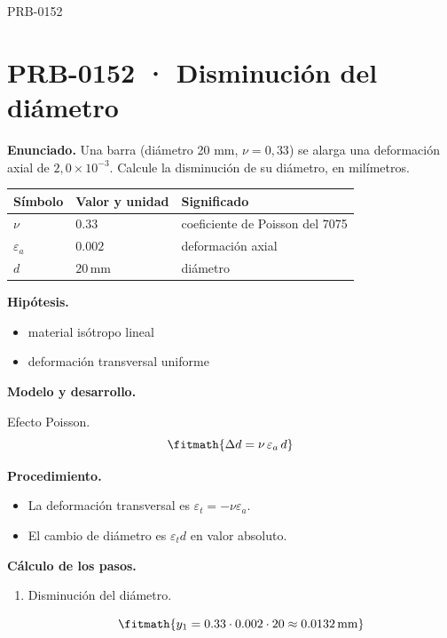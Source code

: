 \Needspace{.3\textheight}

\begin{studiumworked}{PRB-0152}

\section{PRB-0152 · Disminución del diámetro}

\textbf{Enunciado.} Una barra (diámetro 20 mm, $\nu = 0{,}33$) se alarga una deformación axial de $2{,}0\times 10^{-3}$. Calcule la disminución de su diámetro, en milímetros.

\par\medskip\noindent\begin{tabular}{@{}p{.18\linewidth}p{.26\linewidth}p{.48\linewidth}@{}}
\toprule Símbolo & Valor y unidad & Significado\\\midrule
$\nu$ & $0.33$ & coeficiente de Poisson del 7075\\
$\varepsilon_a$ & $0.002$ & deformación axial\\
$d$ & $20\,\mathrm{mm}$ & diámetro\\
\bottomrule\end{tabular}\par\medskip

\textbf{Hipótesis.}\begin{itemize}\item material isótropo lineal
\item deformación transversal uniforme\end{itemize}

\textbf{Modelo y desarrollo.}

Efecto Poisson.\[\fitmath{\Delta d = \nu\,\varepsilon_{a}\,d}\]

\textbf{Procedimiento.}\begin{itemize}\item La deformación transversal es $\varepsilon_t = -\nu\varepsilon_a$.
\item El cambio de diámetro es $\varepsilon_t d$ en valor absoluto.\end{itemize}

\textbf{Cálculo de los pasos.}

\begin{enumerate}

\item Disminución del diámetro.

\[\fitmath{y_{1}=0.33\cdot 0.002\cdot 20\approx 0.0132\,\mathrm{mm}}\]


\end{enumerate}
\end{studiumworked}
